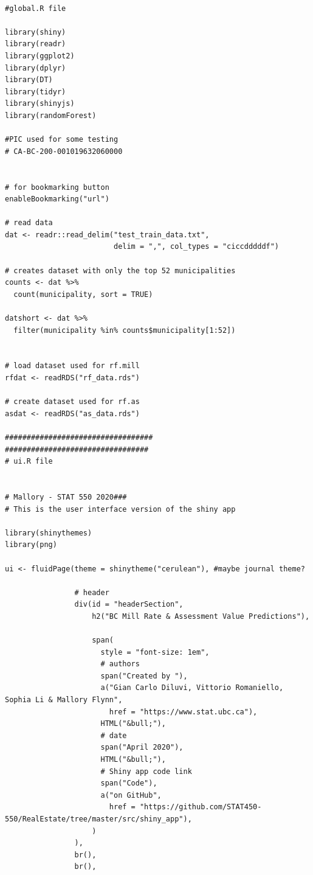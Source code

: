 \documentclass{article}
\begin{document}
\begin{lstlisting}[style=R, caption={Code used for the Shiny app.}, captionpos=b]

#global.R file

library(shiny)
library(readr)
library(ggplot2)
library(dplyr)
library(DT)
library(tidyr)
library(shinyjs)
library(randomForest)

#PIC used for some testing
# CA-BC-200-001019632060000


# for bookmarking button
enableBookmarking("url")

# read data
dat <- readr::read_delim("test_train_data.txt", 
                         delim = ",", col_types = "ciccdddddf")

# creates dataset with only the top 52 municipalities
counts <- dat %>% 
  count(municipality, sort = TRUE)

datshort <- dat %>% 
  filter(municipality %in% counts$municipality[1:52])


# load dataset used for rf.mill
rfdat <- readRDS("rf_data.rds")

# create dataset used for rf.as
asdat <- readRDS("as_data.rds")
  
##################################
#################################
# ui.R file


# Mallory - STAT 550 2020###
# This is the user interface version of the shiny app

library(shinythemes)
library(png)

ui <- fluidPage(theme = shinytheme("cerulean"), #maybe journal theme?

                # header
                div(id = "headerSection",
                    h2("BC Mill Rate & Assessment Value Predictions"),
                    
                    span(
                      style = "font-size: 1em",
                      # authors
                      span("Created by "),
                      a("Gian Carlo Diluvi, Vittorio Romaniello, Sophia Li & Mallory Flynn",
                        href = "https://www.stat.ubc.ca"),
                      HTML("&bull;"),
                      # date
                      span("April 2020"),
                      HTML("&bull;"),
                      # Shiny app code link
                      span("Code"),
                      a("on GitHub", 
                        href = "https://github.com/STAT450-550/RealEstate/tree/master/src/shiny_app"),
                    )
                ),
                br(),
                br(),
                

\end{lstlisting}
\end{document}
